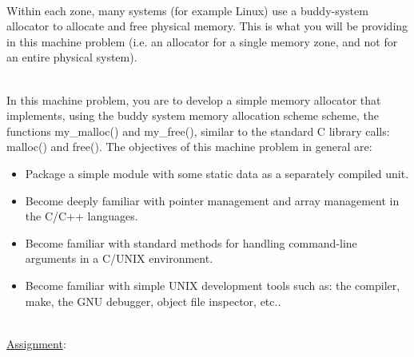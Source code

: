 \documentclass[12pt]{extarticle}
\newenvironment{myindentpar}[1]%
 {\begin{list}{}%
         {\setlength{\leftmargin}{#1}}%
         \item[]%
 }
 {\end{list}}
\begin{document}
\begin{myindentpar}{6.5mm}
    \ \\
    Within each zone, many systems (for example Linux) use a buddy-system allocator to allocate and free physical memory.  This is what you will be providing in this machine problem (i.e. an allocator for a single memory zone, and not for an entire physical system).  
    
    \ \\
    In this machine problem, you are to develop a simple memory allocator that implements, using the buddy system memory allocation scheme scheme, the functions my\_malloc() and my\_free(), similar to the standard C library calls: malloc() and free().  The objectives of this machine problem in general are:
    \begin{itemize}
        \setlength\itemsep{-0.1em}
        
        \item Package a simple module with some static data as a separately compiled unit.  
        \item Become deeply familiar with pointer management and array management in the C/C++ languages.  
        \item Become familiar with standard methods for handling command-line arguments in a C/UNIX environment.  
        \item Become familiar with simple UNIX development tools such as: the compiler, make, the GNU debugger, object file inspector, etc..  
    
    \end{itemize}

\end{myindentpar}

\ \\
{\large \underline{Assignment}:}
\end{document}
